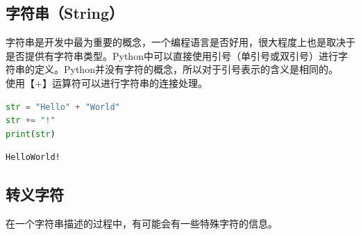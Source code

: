 \subsection{字符串（String）}

字符串是开发中最为重要的概念，一个编程语言是否好用，很大程度上也是取决于是否提供有字符串类型。Python中可以直接使用引号（单引号或双引号）进行字符串的定义。Python并没有字符的概念，所以对于引号表示的含义是相同的。 \\

使用【+】运算符可以进行字符串的连接处理。 \\


\begin{lstlisting}[language=Python]
str = "Hello" + "World"
str += "!"
print(str)
\end{lstlisting}

\begin{tcolorbox}
	\begin{verbatim}
HelloWorld!
	\end{verbatim}
\end{tcolorbox}

\subsection{转义字符}

在一个字符串描述的过程中，有可能会有一些特殊字符的信息。

\begin{table}[H]
	\centering
	\caption{转义字符}
\end{table}


